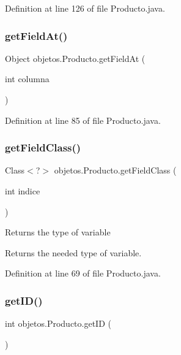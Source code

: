 Definition at line 126 of file Producto.\+java.

\mbox{\label{classobjetos_1_1_producto_a5857c7b25c0113cf682c7ea25a667fab}} 
\subsubsection{\texorpdfstring{get\+Field\+At()}{getFieldAt()}}
{\footnotesize\ttfamily Object objetos.\+Producto.\+get\+Field\+At (\begin{DoxyParamCaption}\item[{int}]{columna }\end{DoxyParamCaption})}



Definition at line 85 of file Producto.\+java.

\mbox{\label{classobjetos_1_1_producto_a6f54f8859ba9713ddb89fd082e811bd8}} 
\subsubsection{\texorpdfstring{get\+Field\+Class()}{getFieldClass()}}
{\footnotesize\ttfamily Class$<$?$>$ objetos.\+Producto.\+get\+Field\+Class (\begin{DoxyParamCaption}\item[{int}]{indice }\end{DoxyParamCaption})}

Returns the type of variable

\begin{DoxyReturn}{Returns}
the needed type of variable. 
\end{DoxyReturn}


Definition at line 69 of file Producto.\+java.

\mbox{\label{classobjetos_1_1_producto_a60da2dbd5b5666a42c88295cf72fc193}} 
\subsubsection{\texorpdfstring{get\+I\+D()}{getID()}}
{\footnotesize\ttfamily int objetos.\+Producto.\+get\+ID (\begin{DoxyParamCaption}{ }\end{DoxyParamCaption})}



